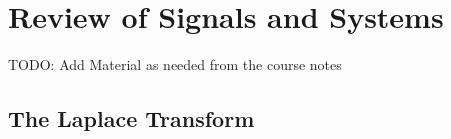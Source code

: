 \documentclass{article}
\theoremstyle{mytheoremstyle}
\theoremstyle{mytheoremstyle}
\theoremstyle{myproblemstyle}
\theoremstyle{break}
\begin{document}

\newpage
\tableofcontents
\newpage
\listoffigures
\newpage
\listoftheorems[ignoreall, show = {problem,solution},swapnumber]{}
\newpage


\section{Review of Signals and Systems}
TODO: Add Material as needed from the course notes

\subsection{The Laplace Transform}
\end{document}

